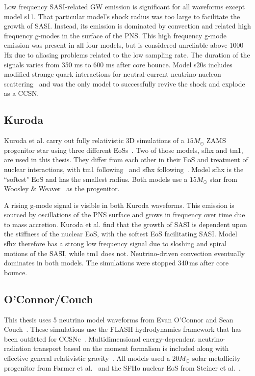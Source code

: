 Low frequency SASI-related GW emission is significant for all waveforms except model s11. That particular model's shock radius was too large to facilitate the growth of SASI. Instead, its emission is dominated by convection and related high frequency g-modes in the surface of the PNS. This high frequency g-mode emission was present in all four models, but is considered unreliable above 1000\,Hz due to aliasing problems related to the low sampling rate. The duration of the signals varies from 350 ms to 600 ms after core bounce. Model s20s includes modified strange quark interactions for neutral-current neutrino-nucleon scattering~\cite{melson2015neutrino} and was the only model to successfully revive the shock and explode as a CCSN.

\subsection{Kuroda}

Kuroda et al. carry out fully relativistic 3D simulations of a $15M_\odot$ ZAMS progenitor star using three different EoSs~\cite{kuroda:16}. Two of those models, sfhx and tm1, are used in this thesis. They differ from each other in their EoS and treatment of nuclear interactions, with tm1 following~\cite{hempel2010statistical} and sfhx following~\cite{steiner2013core}. Model sfhx is the ``softest" EoS and has the smallest radius. Both models use a $15M_\odot$ star from Woosley \& Weaver~\cite{woosley1995evolution} as the progenitor.

A rising g-mode signal is visible in both Kuroda waveforms. This emission is sourced by oscillations of the PNS surface and grows in frequency over time due to mass accretion. Kuroda et al. find that the growth of SASI is dependent upon the stiffness of the nuclear EoS, with the softest EoS facilitating SASI. Model sfhx therefore has a strong low frequency signal due to sloshing and spiral motions of the SASI, while tm1 does not. Neutrino-driven convection eventually dominates in both models. The simulations were stopped 340\,ms after core bounce.

\subsection{O'Connor/Couch}

This thesis uses 5 neutrino model waveforms from Evan O'Connor and Sean Couch~\cite{o2018exploring}. These simulations use the FLASH hydrodynamics framework that has been outfitted for CCSNe~\cite{couch2013impact, couch2014high}. Multidimensional energy-dependent neutrino-radiation transport based on the moment formalism is included along with effective general relativistic gravity~\cite{o2018two}. All models used a $20M_\odot$ solar metallicity progenitor from Farmer et al.~\cite{farmer2016variations} and the SFHo nuclear EoS from Steiner et al.~\cite{steiner2013core}.

